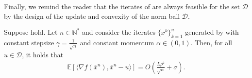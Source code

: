 Finally, we remind the reader that the iterates of  are always feasible for the set $\mathcal{D}$ by the design of the update and convexity of the norm ball $\mathcal{D}$.
\begin{lemmarep}
    Suppose  hold. Let $n\in\mathbb{N}^*$ and consider the iterates $\{x^k\}_{k=1}^n$ generated by  with constant stepsize $\gamma=\tfrac{1}{\sqrt{n}}$ and constant momentum $\alpha \in(0,1)$. Then, for all $u\in\mathcal{D}$, it holds that
    \begin{equation*}
        \begin{aligned}
            \mathbb{E}[\langle \nabla f(\bar{x}^n), \bar{x}^n-u\rangle] = O\left(\tfrac{L\rho^2}{\sqrt{n}} + \sigma\right).
        \end{aligned}
    \end{equation*}
\end{lemmarep}
